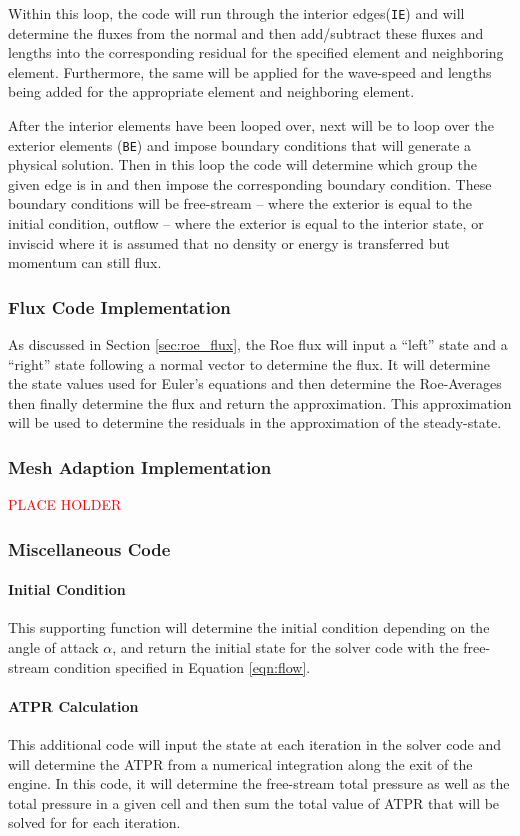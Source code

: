 Within this loop, the code will run through the interior edges({\texttt{IE}}) and will determine the fluxes from the normal and then add/subtract these fluxes and lengths into the corresponding residual for the specified element and neighboring element. Furthermore, the same will be applied for the wave-speed and lengths being added for the appropriate element and neighboring element.

After the interior elements have been looped over, next will be to loop over the exterior elements ({\texttt{BE}}) and impose boundary conditions that will generate a physical solution. Then in this loop the code will determine which group the given edge is in and then impose the corresponding boundary condition. These boundary conditions will be free-stream -- where the exterior is equal to the initial condition, outflow -- where the exterior is equal to the interior state, or inviscid where it is assumed that no density or energy is transferred but momentum can still flux.

\pagebreak
\subsubsection{Flux Code Implementation}
As discussed in Section \ref{sec:roe_flux}, the Roe flux will input a ``left'' state and a ``right'' state following a normal vector to determine the flux. It will determine the state values used for Euler's equations and then determine the Roe-Averages then finally determine the flux and return the approximation. This approximation will be used to determine the residuals in the approximation of the steady-state.


\subsubsection{Mesh Adaption Implementation}
\textcolor{red}{\large PLACE HOLDER}

\subsubsection{Miscellaneous Code}
\paragraph{Initial Condition} This supporting function will determine the initial condition depending on the angle of attack $\alpha$, and return the initial state for the solver code with the free-stream condition specified in Equation \ref{eqn:flow}.

\paragraph{ATPR Calculation} This additional code will input the state at each iteration in the solver code and will determine the ATPR from a numerical integration along the exit of the engine. In this code, it will determine the free-stream total pressure as well as the total pressure in a given cell and then sum the total value of ATPR that will be solved for for each iteration.